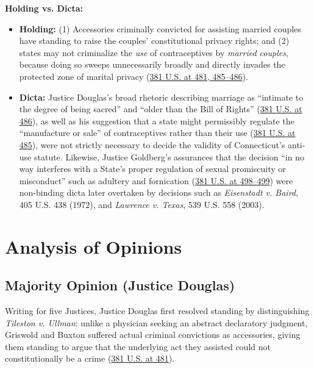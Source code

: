 \documentclass[12pt]{article}
\begin{document}
\textbf{Holding vs. Dicta:}
\begin{itemize}
    \item \textbf{Holding:} (1) Accessories criminally convicted for assisting married couples have standing to raise the couples' constitutional privacy rights; and (2) states may not criminalize the \textit{use} of contraceptives by \textit{married couples}, because doing so sweeps unnecessarily broadly and directly invades the protected zone of marital privacy (\href{https://supreme.justia.com/cases/federal/us/381/479/}{381 U.S. at 481, 485--486}).
    \item \textbf{Dicta:} Justice Douglas's broad rhetoric describing marriage as ``intimate to the degree of being sacred'' and ``older than the Bill of Rights'' (\href{https://supreme.justia.com/cases/federal/us/381/479/}{381 U.S. at 486}), as well as his suggestion that a state might permissibly regulate the ``manufacture or sale'' of contraceptives rather than their use (\href{https://supreme.justia.com/cases/federal/us/381/479/}{381 U.S. at 485}), were not strictly necessary to decide the validity of Connecticut's anti-use statute. Likewise, Justice Goldberg's assurances that the decision ``in no way interferes with a State's proper regulation of sexual promiscuity or misconduct'' such as adultery and fornication (\href{https://supreme.justia.com/cases/federal/us/381/479/}{381 U.S. at 498--499}) were non-binding dicta later overtaken by decisions such as \textit{Eisenstadt v. Baird}, 405 U.S. 438 (1972), and \textit{Lawrence v. Texas}, 539 U.S. 558 (2003).
\end{itemize}

\section{Analysis of Opinions}

\subsection{Majority Opinion (Justice Douglas)}
Writing for five Justices, Justice Douglas first resolved standing by distinguishing \textit{Tileston v. Ullman}: unlike a physician seeking an abstract declaratory judgment, Griswold and Buxton suffered actual criminal convictions as accessories, giving them standing to argue that the underlying act they assisted could not constitutionally be a crime (\href{https://supreme.justia.com/cases/federal/us/381/479/}{381 U.S. at 481}).
\end{document}
